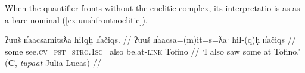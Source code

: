 When the quantifier fronts without the enclitic complex, its interpretatio is as as a bare nominal (\ref{ex:uushfrontnoclitic}).

\ex \label{ex:uushfrontnoclitic}
\begingl
\glpreamble ʔuuš n̓aacsamitsƛa hiłqḥ n̓ačiqs. //
\gla ʔuuš n̓aacsa=(m)it=s=ƛaˑ hił-(q)ḥ n̓ačiqs  //
\glb some see.\textsc{cv}=\textsc{pst}=\textsc{strg.1sg}=also be.at-\textsc{link} Tofino //
\glft `I also saw some at Tofino.' (\textbf{C}, \textit{tupaat} Julia Lucas) //
\endgl
\xe

\begin{comment}
This same pattern with respect to \textit{ʔuuš} is present in Sapir's original data.\footnotemark{} \textit{ʔuušił}, which is \textit{ʔuuš} `some' with the object marking \textit{-L.(č)ił} attached, behaves the same way in my data. \textit{ʔuušił} may be fronted without the second position enclitics, as already seen in (\ref{ex:uushilfront}), or it may then take the enclitics, as in (\ref{ex:uushilfrontclitic}) below. I could not find any \textit{ʔuušił} fronting in the Nootka Texts, so \textit{ʔuušił} fronting may represent a change in the language in the intervening generations.

\footnotetext{\noindent With the clitic complex:

\ex~ \label{ex:uushfrontcliticNT}
\begingl
\glpreamble ʔuušʔaƛ maqw̓in. //
\gla ʔuuš=!aƛ maq-w̓in  //
\glb some=\textsc{now} tie-middle //
\glft `Some are tied about the middle.' \citep[70]{sapir1955} //
\endgl
\xe

\noindent Without the clitic complex:

\ex~ \label{ex:uushfrontnocliticNT}
\begingl
\glpreamble ʔuuš saac̓inłšiʔaƛƛaa ʔaḥʔaa ƛ̓acʔii ƛ̓isitʔi sac̓up. //
\gla ʔuuš saac̓inł-šiƛ=!aƛ=ƛaa ʔaḥʔaa ƛ̓ac=ʔiˑ ƛ̓isit=ʔiˑ sac̓up  //
\glb some seafood.feast(?)-\textsc{mo}=\textsc{now}=also \textsc{dtop} fat=\textsc{art} white=\textsc{art} spring.salmon //
\glft `Some would start feasting with the fat, white-bodied tyee salmon.' \citep[22]{sapir1955} //
\endgl
\xe
}

\ex \label{ex:uushilfrontclitic}
\begingl
\glpreamble ʔuušiłqaˑč̓a n̓aacsa. //
\gla ʔuuš-L.(č)ił=qaˑč̓a n̓aacsa  //
\glb some-\textsc{do.to}=\textsc{infr.3} see.\textsc{cv} //
\glft `He must've seen something.' (\textbf{C}, \textit{tupaat} Julia Lucas) //
\endgl
\xe

I have no examples of the strong quantifier \textit{hišuk} `all' fronting without the second position complex, and it is possibly ungrammatical. The version of the strong quantifier in the Nootka texts, \textit{č̓uučk}, does not occur in a fronting environment where the enclitics unambiguously fall on the following predicate. (That is, in a case where the enclitic could not be a singly null-marked third person morpheme.)
\end{comment}

